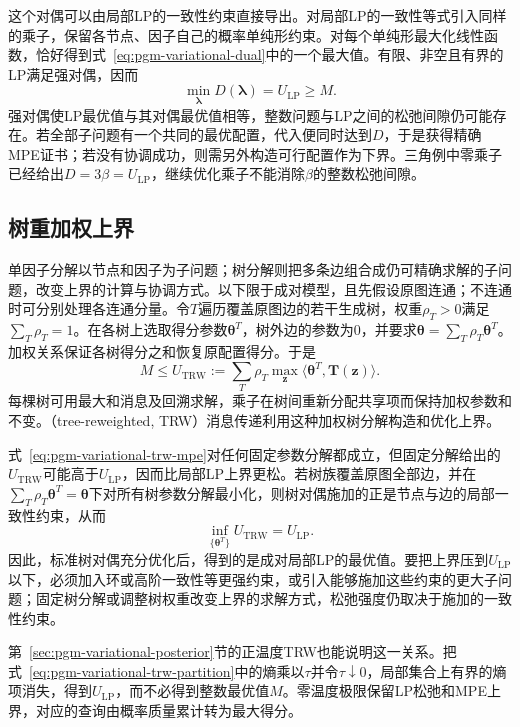 这个对偶可以由局部LP的一致性约束直接导出。对局部LP的一致性等式引入同样的乘子，保留各节点、因子自己的概率单纯形约束。对每个单纯形最大化线性函数，恰好得到式~\eqref{eq:pgm-variational-dual}中的一个最大值。有限、非空且有界的LP满足强对偶，因而
\begin{equation}
  \min_{\bm{\lambda}}D(\bm{\lambda})=U_{\mathrm{LP}}\geq M.
  \label{eq:pgm-variational-dual-lp}
\end{equation}
强对偶使LP最优值与其对偶最优值相等，整数问题与LP之间的松弛间隙仍可能存在。若全部子问题有一个共同的最优配置，代入便同时达到$D$，于是获得精确MPE证书；若没有协调成功，则需另外构造可行配置作为下界。三角例中零乘子已经给出$D=3\beta=U_{\mathrm{LP}}$，继续优化乘子不能消除$\beta$的整数松弛间隙。

\subsection{树重加权上界}
\label{sec:pgm-variational-trw-mpe}

单因子分解以节点和因子为子问题；树分解则把多条边组合成仍可精确求解的子问题，改变上界的计算与协调方式。以下限于成对模型，且先假设原图连通；不连通时可分别处理各连通分量。令$T$遍历覆盖原图边的若干生成树，权重$\rho_T>0$满足$\sum_T\rho_T=1$。在各树上选取得分参数$\bm{\theta}^T$，树外边的参数为$0$，并要求$\bm{\theta}=\sum_T\rho_T\bm{\theta}^T$。加权关系保证各树得分之和恢复原配置得分。于是
\begin{equation}
  M\leq U_{\mathrm{TRW}}
     :=\sum_T\rho_T\max_{\bm z}
                    \langle\bm{\theta}^T,\bm T(\bm z)\rangle.
  \label{eq:pgm-variational-trw-mpe}
\end{equation}
每棵树可用最大和消息及回溯求解，乘子在树间重新分配共享项而保持加权参数和不变。（tree-reweighted, TRW）消息传递利用这种加权树分解构造和优化上界。

式~\eqref{eq:pgm-variational-trw-mpe}对任何固定参数分解都成立，但固定分解给出的$U_{\mathrm{TRW}}$可能高于$U_{\mathrm{LP}}$，因而比局部LP上界更松。若树族覆盖原图全部边，并在$\sum_T\rho_T\bm{\theta}^T=\bm{\theta}$下对所有树参数分解最小化，则树对偶施加的正是节点与边的局部一致性约束，从而
\[
  \inf_{\{\bm{\theta}^T\}}
     U_{\mathrm{TRW}}=U_{\mathrm{LP}}.
\]
因此，标准树对偶充分优化后，得到的是成对局部LP的最优值。要把上界压到$U_{\mathrm{LP}}$以下，必须加入环或高阶一致性等更强约束，或引入能够施加这些约束的更大子问题；固定树分解或调整树权重改变上界的求解方式，松弛强度仍取决于施加的一致性约束。

第~\ref{sec:pgm-variational-posterior}节的正温度TRW也能说明这一关系。把式~\eqref{eq:pgm-variational-trw-partition}中的熵乘以$\tau$并令$\tau\downarrow0$，局部集合上有界的熵项消失，得到$U_{\mathrm{LP}}$，而不必得到整数最优值$M$。零温度极限保留LP松弛和MPE上界，对应的查询由概率质量累计转为最大得分。

